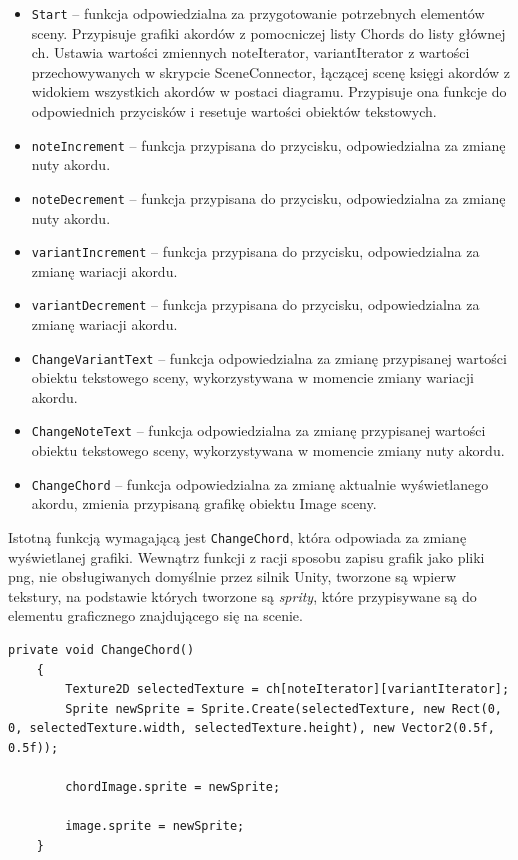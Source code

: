 \begin{itemize}
    \item \texttt{Start} -- funkcja odpowiedzialna za przygotowanie potrzebnych elementów sceny. Przypisuje grafiki akordów z pomocniczej listy Chords do listy głównej ch. Ustawia wartości zmiennych noteIterator, variantIterator z wartości przechowywanych w skrypcie SceneConnector, łączącej scenę księgi akordów z widokiem wszystkich akordów w postaci diagramu. Przypisuje ona funkcje do odpowiednich przycisków i resetuje wartości obiektów tekstowych.
    \item \texttt{noteIncrement} -- funkcja przypisana do przycisku, odpowiedzialna za zmianę nuty akordu.
    \item \texttt{noteDecrement} -- funkcja przypisana do przycisku, odpowiedzialna za zmianę nuty akordu.
    \item \texttt{variantIncrement} -- funkcja przypisana do przycisku, odpowiedzialna za zmianę wariacji akordu.
    \item \texttt{variantDecrement} -- funkcja przypisana do przycisku, odpowiedzialna za zmianę wariacji akordu.
    \item \texttt{ChangeVariantText} -- funkcja odpowiedzialna za zmianę przypisanej wartości obiektu tekstowego sceny, wykorzystywana w momencie zmiany wariacji akordu.
    \item \texttt{ChangeNoteText} -- funkcja odpowiedzialna za zmianę przypisanej wartości obiektu tekstowego sceny, wykorzystywana w momencie zmiany nuty akordu.
    \item \texttt{ChangeChord} -- funkcja odpowiedzialna za zmianę aktualnie wyświetlanego akordu, zmienia przypisaną grafikę obiektu Image sceny.
\end{itemize}

Istotną funkcją wymagającą jest \texttt{ChangeChord}, która odpowiada za zmianę wyświetlanej grafiki. Wewnątrz funkcji z racji sposobu zapisu grafik jako pliki png, nie obsługiwanych domyślnie przez silnik Unity, tworzone są wpierw tekstury, na podstawie których tworzone są \emph{sprity}, które przypisywane są do elementu graficznego znajdującego się na scenie.

\begin{lstlisting}[style=sharpcstyle,caption=Funkcja \texttt{ChangeChord}, label=lst:3]
    private void ChangeChord()
    {
        Texture2D selectedTexture = ch[noteIterator][variantIterator];
        Sprite newSprite = Sprite.Create(selectedTexture, new Rect(0, 0, selectedTexture.width, selectedTexture.height), new Vector2(0.5f, 0.5f));
        
        chordImage.sprite = newSprite;
        
        image.sprite = newSprite;
    }
\end{lstlisting}

